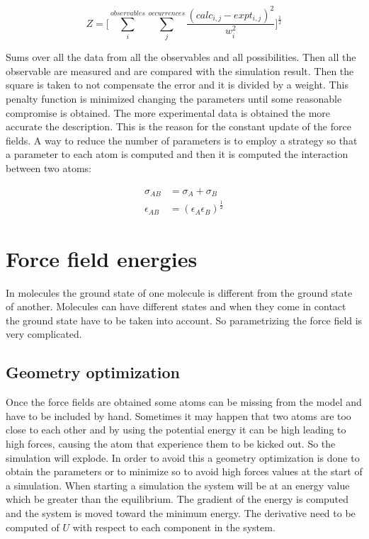 $$Z = \biggl[\sum\limits_{i}^{observables}\sum\limits_{j}^{occurrences}\frac{(calc_{i,j}-expt_{i,j})^2}{w_i^2}\biggr]^{\frac{1}{2}}$$

Sums over all the data from all the observables and all possibilities.
Then all the observable are measured and are compared with the simulation result.
Then the square is taken to not compensate the error and it is divided by a weight.
This penalty function is minimized changing the parameters until some reasonable compromise is obtained.
The more experimental data is obtained the more accurate the description.
This is the reason for the constant update of the force fields.
A way to reduce the number of parameters is to employ a strategy so that a parameter to each atom is computed and then it is computed the interaction between two atoms:

\begin{align*}
	\sigma_{AB} &= \sigma_A+\sigma_B\\
	\epsilon_{AB} &= (\epsilon_A\epsilon_B)^{\frac{1}{2}}
\end{align*}

\section{Force field energies}
In molecules the ground state of one molecule is different from the ground state of another.
Molecules can have different states and when they come in contact the ground state have to be taken into account.
So parametrizing the force field is very complicated.

	\subsection{Geometry optimization}
	Once the force fields are obtained some atoms can be missing from the model and have to be included by hand.
	Sometimes it may happen that two atoms are too close to each other and by using the potential energy it can be high leading to high forces, causing the atom that experience them to be kicked out.
	So the simulation will explode.
	In order to avoid this a geometry optimization is done to obtain the parameters or to minimize so to avoid high forces values at the start of a simulation.
	When starting a simulation the system will be at an energy value which be greater than the equilibrium.
	The gradient of the energy is computed and the system is moved toward the minimum energy.
	The derivative need to be computed of $U$ with respect to each component in the system.

